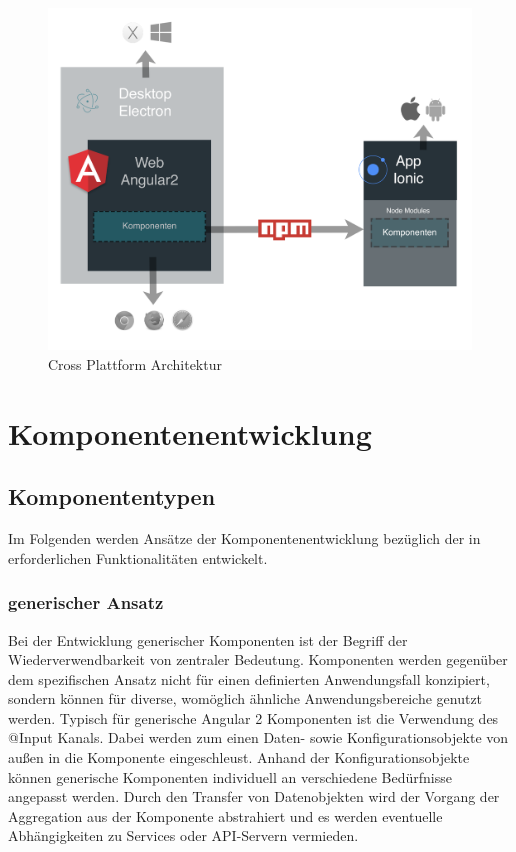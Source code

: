 \begin{figure}[h]
 \centering
 \includegraphics[width=\linewidth]{kapitel4/arch.png}
 \caption{Cross Plattform Architektur}
 \label{kapitel4/arch}
\end{figure}
\vspace{0.3cm}



\section{Komponentenentwicklung}

\subsection{Komponententypen}

Im Folgenden werden Ansätze der Komponentenentwicklung bezüglich der in
\projectname{} erforderlichen Funktionalitäten entwickelt.


\subsubsection{generischer Ansatz}

Bei der Entwicklung generischer Komponenten ist der Begriff der Wiederverwendbarkeit von zentraler Bedeutung.
Komponenten werden gegenüber dem spezifischen Ansatz nicht für einen definierten Anwendungsfall konzipiert,
sondern können
für diverse, womöglich ähnliche Anwendungsbereiche genutzt werden.
Typisch für generische Angular 2 Komponenten ist die Verwendung des @Input Kanals.
Dabei werden zum einen Daten- sowie Konfigurationsobjekte von außen in die Komponente eingeschleust.
Anhand der Konfigurationsobjekte können generische Komponenten individuell an verschiedene Bedürfnisse angepasst werden.
Durch den Transfer von Datenobjekten wird der Vorgang der Aggregation aus der Komponente abstrahiert und es werden eventuelle
Abhängigkeiten zu Services oder API-Servern vermieden.

